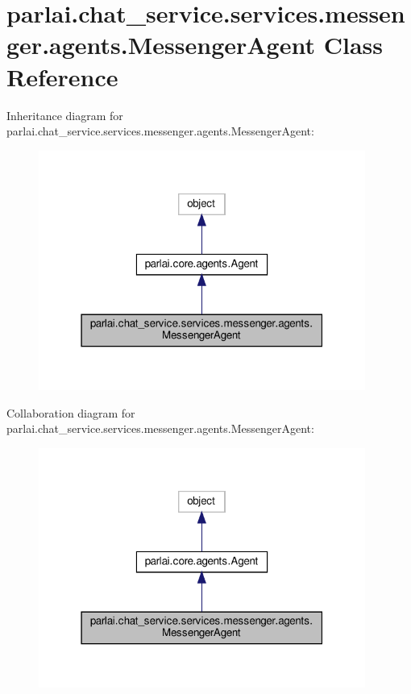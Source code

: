 \hypertarget{classparlai_1_1chat__service_1_1services_1_1messenger_1_1agents_1_1MessengerAgent}{}\section{parlai.\+chat\+\_\+service.\+services.\+messenger.\+agents.\+Messenger\+Agent Class Reference}
\label{classparlai_1_1chat__service_1_1services_1_1messenger_1_1agents_1_1MessengerAgent}


Inheritance diagram for parlai.\+chat\+\_\+service.\+services.\+messenger.\+agents.\+Messenger\+Agent\+:
\nopagebreak
\begin{figure}[H]
\begin{center}
\leavevmode
\includegraphics[width=304pt]{d7/da0/classparlai_1_1chat__service_1_1services_1_1messenger_1_1agents_1_1MessengerAgent__inherit__graph}
\end{center}
\end{figure}


Collaboration diagram for parlai.\+chat\+\_\+service.\+services.\+messenger.\+agents.\+Messenger\+Agent\+:
\nopagebreak
\begin{figure}[H]
\begin{center}
\leavevmode
\includegraphics[width=304pt]{dc/d52/classparlai_1_1chat__service_1_1services_1_1messenger_1_1agents_1_1MessengerAgent__coll__graph}
\end{center}
\end{figure}
